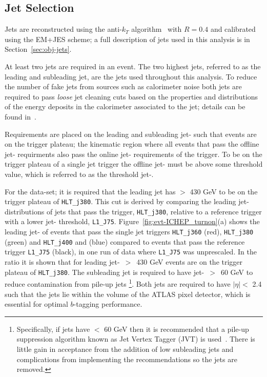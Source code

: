 \subsection{Jet Selection}
\label{sec:evt-sel-jets}

Jets are reconstructed using the anti-$k_T$ algorithm~\cite{obj-jets_reco_akt} with $R=0.4$
and calibrated using the EM+JES scheme;
a full description of jets used in this analysis is in Section~\ref{sec:obj-jets}.

At least two jets are required in an event.
The two highest \pT{} jets, referred to as the leading and subleading jet,
are the jets used throughout this analysis.
To reduce the number of fake jets from sources such as calorimeter noise
both jets are required to pass \textit{loose} jet cleaning cuts
based on the properties and distributions of the energy deposits in the calorimeter associated to the jet;
details can be found in~\cite{evt-jet_cleaning}.

Requirements are placed on  the leading and subleading jet-\pT{} such that events are on the trigger plateau;
the kinematic region where all events that pass the offline jet-\pT{} requirments
also pass the online jet-\pT{} requirements of the trigger.
To be on the trigger plateau of a single jet trigger the offline jet-\pT{} must be above some threshold value,
which is referred to as the threshold jet-\pT{}.

For the \summer{} data-set; it is required that the leading jet has \pT{} $>$ 430 GeV to be on the trigger plateau of \verb|HLT_j380|.
This cut is derived by comparing the leading jet-\pT{} distributions of jets that pass the trigger, \verb|HLT_j380|,
relative to a reference trigger with a lower jet-\pT{} threshold, \verb|L1_J75|.
Figure~\ref{fig:evt-ICHEP_turnon}(a) shows the leading jet-\pT{}
of events that pass the single jet triggers \verb|HLT_j360| (red), \verb|HLT_j380| (green) and \verb|HLT_j400| and (blue)
compared to events that pass the reference trigger \verb|L1_J75| (black),
in one run of data where \verb|L1_J75| was unprescaled.
In the ratio it is shown that for leading jet-\pT{}~$>$~430 GeV events are on the trigger plateau of \verb|HLT_j380|.
The subleading jet is required to have jet-\pT{}~$>$~60 GeV
to reduce contamination from pile-up jets
\footnote{Specifically, if jets have \pT{} $<$ 60 GeV then it is recommended that
  a pile-up suppression algorithm known as Jet Vertex Tagger (JVT) is used~\cite{evt-jvt}.
  There is little gain in acceptance from the addition of low \pT{} subleading jets and
  complications from implementing the recommendations so the jets are removed. }.
Both jets  are required to have $|\eta| <$ 2.4
such that the jets lie within the volume of the ATLAS pixel detector,
which is essential for optimal $b$-tagging performance.

